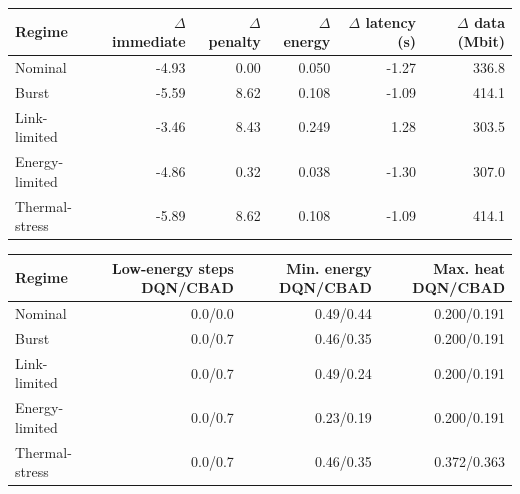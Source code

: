 \begin{tabular}{lrrrrr}
\toprule
Regime & $\Delta$ immediate & $\Delta$ penalty & $\Delta$ energy & $\Delta$ latency (s) & $\Delta$ data (Mbit) \\
\midrule
Nominal & -4.93 & 0.00 & 0.050 & -1.27 & 336.8 \\
Burst & -5.59 & 8.62 & 0.108 & -1.09 & 414.1 \\
Link-limited & -3.46 & 8.43 & 0.249 & 1.28 & 303.5 \\
Energy-limited & -4.86 & 0.32 & 0.038 & -1.30 & 307.0 \\
Thermal-stress & -5.89 & 8.62 & 0.108 & -1.09 & 414.1 \\
\bottomrule
\end{tabular}
\par\medskip
\begin{tabular}{lrrr}
\toprule
Regime & Low-energy steps DQN/CBAD & Min. energy DQN/CBAD & Max. heat DQN/CBAD \\
\midrule
Nominal & 0.0/0.0 & 0.49/0.44 & 0.200/0.191 \\
Burst & 0.0/0.7 & 0.46/0.35 & 0.200/0.191 \\
Link-limited & 0.0/0.7 & 0.49/0.24 & 0.200/0.191 \\
Energy-limited & 0.0/0.7 & 0.23/0.19 & 0.200/0.191 \\
Thermal-stress & 0.0/0.7 & 0.46/0.35 & 0.372/0.363 \\
\bottomrule
\end{tabular}